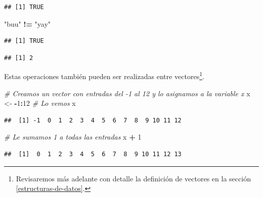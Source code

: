 \documentclass[]{article}
\newenvironment{Shaded}{\begin{snugshade}}{\end{snugshade}}
\newcommand{\DecValTok}[1]{\textcolor[rgb]{0.00,0.00,0.81}{#1}}
\newcommand{\StringTok}[1]{\textcolor[rgb]{0.31,0.60,0.02}{#1}}
\newcommand{\CommentTok}[1]{\textcolor[rgb]{0.56,0.35,0.01}{\textit{#1}}}
\newcommand{\OperatorTok}[1]{\textcolor[rgb]{0.81,0.36,0.00}{\textbf{#1}}}
\newcommand{\NormalTok}[1]{#1}
\let\rmarkdownfootnote\footnote%
\def\footnote{\protect\rmarkdownfootnote}
\begin{document}
\begin{verbatim}
## [1] TRUE
\end{verbatim}

\begin{Shaded}
\begin{Highlighting}[]
\StringTok{"buu"} \OperatorTok{!=}\StringTok{ "yay"}
\end{Highlighting}
\end{Shaded}

\begin{verbatim}
## [1] TRUE
\end{verbatim}

\begin{Shaded}
\end{Shaded}

\begin{verbatim}
## [1] 2
\end{verbatim}

Estas operaciones también pueden ser realizadas entre vectores\footnote{Revisaremos
  más adelante con detalle la definición de vectores en la sección
  \ref{estructuras-de-datos}.}.

\begin{Shaded}
\begin{Highlighting}[]
\CommentTok{# Creamos un vector con entradas del -1 al 12 y lo asignamos a la variable x}
\NormalTok{x <-}\StringTok{ }\OperatorTok{-}\DecValTok{1}\OperatorTok{:}\DecValTok{12}
\CommentTok{# Lo vemos}
\NormalTok{x}
\end{Highlighting}
\end{Shaded}

\begin{verbatim}
##  [1] -1  0  1  2  3  4  5  6  7  8  9 10 11 12
\end{verbatim}

\begin{Shaded}
\begin{Highlighting}[]
\CommentTok{# Le sumamos 1 a todas las entradas}
\NormalTok{x }\OperatorTok{+}\StringTok{ }\DecValTok{1}
\end{Highlighting}
\end{Shaded}

\begin{verbatim}
##  [1]  0  1  2  3  4  5  6  7  8  9 10 11 12 13
\end{verbatim}
\end{document}

